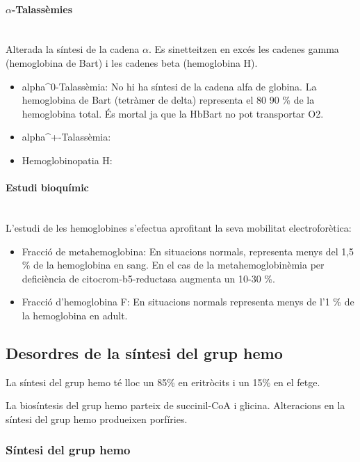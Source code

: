 \paragraph{$\alpha$-Talassèmies} \hfill \\
Alterada la síntesi de la cadena $\alpha$. Es sinetteitzen en excés les
cadenes gamma (hemoglobina de Bart) i les cadenes beta (hemoglobina
H).

\begin{itemize}
\item alpha^0-Talassèmia: No hi ha síntesi de la cadena alfa de
  globina. La hemoglobina de Bart (tetràmer de delta) representa el 80
  90 \% de la hemoglobina total. És mortal ja que la HbBart no pot
    transportar O2.

  \item alpha^+-Talassèmia: 

  \item Hemoglobinopatia H: 
\end{itemize}

\paragraph*{Estudi bioquímic} \hfill \\
L'estudi de les hemoglobines s'efectua aprofitant la seva mobilitat
electroforètica:
\begin{itemize}
\item Fracció de metahemoglobina: En situacions normals, representa
  menys del 1,5 \% de la hemoglobina en sang. En el cas de la
  metahemoglobinèmia per deficiència de citocrom-b5-reductasa augmenta
  un 10-30 \%.

\item Fracció d'hemoglobina F: En situacions normals representa menys
  de l'1 \% de la hemoglobina en adult.


\end{itemize}


\subsection{Desordres de la síntesi del grup hemo}
La síntesi del grup hemo té lloc un 85\% en eritròcits i un 15\% en el
fetge.

La biosíntesis del grup hemo parteix de succinil-CoA i
glicina. Alteracions en la síntesi del grup hemo produeixen porfíries.

\subsubsection*{Síntesi del grup hemo}

